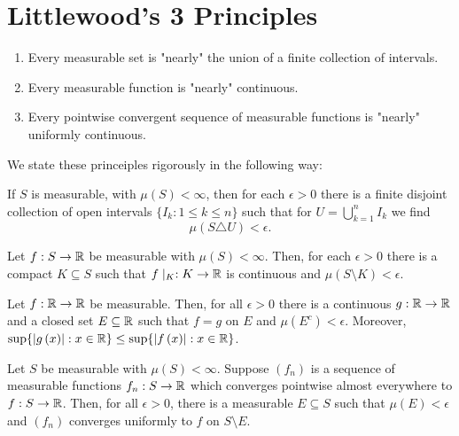 \section{Littlewood's 3 Principles}
\begin{remark}
	\begin{enumerate}
		\item Every measurable set is "nearly" the union of a finite collection of intervals.
			\item Every measurable function is "nearly" continuous.
				\item Every pointwise convergent sequence of measurable functions is "nearly" uniformly continuous.
	\end{enumerate}
\end{remark}
We state these princeiples rigorously in the following way:
\begin{theorem}
	If \(S\) is measurable, with \( \mu\left( S \right) < \infty\), then for each \(\epsilon > 0\) there is a finite disjoint collection of open intervals \(\{I_{k} : 1 \le k \le n\} \) such that for \(U = \bigcup_{k=1} ^{n} I_{k}\) we find \[
		\mu\left( S \triangle U \right)  < \epsilon
	.\]
\end{theorem}
\begin{theorem}
	Let \(f: S \to \mathbb{R}\) be measurable with \( \mu\left( S \right)  < \infty\). Then, for each \(\epsilon > 0\)  there is a compact \(K \subseteq S\)  such that \(f\mid _{K} : K \to \mathbb{R}\)  is continuous and \( \mu\left( S \setminus K \right)  < \epsilon\).
\end{theorem}
\begin{theorem}
	Let \(f: \mathbb{R} \to \mathbb{R}\) 	 be measurable. Then, for all \(\epsilon > 0\) there is a continuous \(g: \mathbb{R} \to \mathbb{R}\)  and a closed set \(E \subseteq \mathbb{R}\)  such that \(f = g\)  on \(E\)  and \( \mu\left( E^{c} \right) < \epsilon\). Moreover, \(\sup \{ \left| g\left( x \right)  \right|  : x \in \mathbb{R}  \} \le \sup \{ \left| f\left( x \right)  \right|  : x \in \mathbb{R} \} \).
\end{theorem}
\begin{theorem}
	Let \(S\) be measurable with \( \mu\left( S \right) < \infty\). Suppose \(\left( f_{n} \right) \)  is a sequence of measurable functions \(f_{n}:S  \to\mathbb{R} \) which converges pointwise almost everywhere to \(f: S \to \mathbb{R}\). Then, for all \(\epsilon > 0\), there is a measurable \(E \subseteq S\) such that \( \mu\left( E \right)  < \epsilon\) and \(\left( f_{n} \right) \) converges uniformly to \(f\) on \(S \setminus E\).
\end{theorem}
